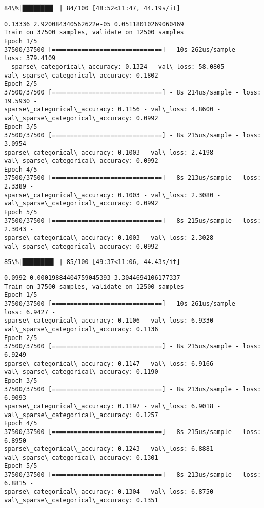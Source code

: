 \documentclass[11pt]{article}
\begin{document}
    \begin{Verbatim}[commandchars=\\\{\}]
 84\%|████████▍ | 84/100 [48:52<11:47, 44.19s/it]
    \end{Verbatim}

    \begin{Verbatim}[commandchars=\\\{\}]
0.13336 2.920084340562622e-05 0.05118010269060469
Train on 37500 samples, validate on 12500 samples
Epoch 1/5
37500/37500 [==============================] - 10s 262us/sample - loss: 379.4109
- sparse\_categorical\_accuracy: 0.1324 - val\_loss: 58.0805 -
val\_sparse\_categorical\_accuracy: 0.1802
Epoch 2/5
37500/37500 [==============================] - 8s 214us/sample - loss: 19.5930 -
sparse\_categorical\_accuracy: 0.1156 - val\_loss: 4.8600 -
val\_sparse\_categorical\_accuracy: 0.0992
Epoch 3/5
37500/37500 [==============================] - 8s 215us/sample - loss: 3.0954 -
sparse\_categorical\_accuracy: 0.1003 - val\_loss: 2.4198 -
val\_sparse\_categorical\_accuracy: 0.0992
Epoch 4/5
37500/37500 [==============================] - 8s 213us/sample - loss: 2.3389 -
sparse\_categorical\_accuracy: 0.1003 - val\_loss: 2.3080 -
val\_sparse\_categorical\_accuracy: 0.0992
Epoch 5/5
37500/37500 [==============================] - 8s 215us/sample - loss: 2.3043 -
sparse\_categorical\_accuracy: 0.1003 - val\_loss: 2.3028 -
val\_sparse\_categorical\_accuracy: 0.0992
    \end{Verbatim}

    \begin{Verbatim}[commandchars=\\\{\}]
 85\%|████████▌ | 85/100 [49:37<11:06, 44.43s/it]
    \end{Verbatim}

    \begin{Verbatim}[commandchars=\\\{\}]
0.0992 0.00019884404759045393 3.3044694106177337
Train on 37500 samples, validate on 12500 samples
Epoch 1/5
37500/37500 [==============================] - 10s 261us/sample - loss: 6.9427 -
sparse\_categorical\_accuracy: 0.1106 - val\_loss: 6.9330 -
val\_sparse\_categorical\_accuracy: 0.1136
Epoch 2/5
37500/37500 [==============================] - 8s 215us/sample - loss: 6.9249 -
sparse\_categorical\_accuracy: 0.1147 - val\_loss: 6.9166 -
val\_sparse\_categorical\_accuracy: 0.1190
Epoch 3/5
37500/37500 [==============================] - 8s 213us/sample - loss: 6.9093 -
sparse\_categorical\_accuracy: 0.1197 - val\_loss: 6.9018 -
val\_sparse\_categorical\_accuracy: 0.1257
Epoch 4/5
37500/37500 [==============================] - 8s 215us/sample - loss: 6.8950 -
sparse\_categorical\_accuracy: 0.1243 - val\_loss: 6.8881 -
val\_sparse\_categorical\_accuracy: 0.1301
Epoch 5/5
37500/37500 [==============================] - 8s 213us/sample - loss: 6.8815 -
sparse\_categorical\_accuracy: 0.1304 - val\_loss: 6.8750 -
val\_sparse\_categorical\_accuracy: 0.1351
    \end{Verbatim}
\end{document}
